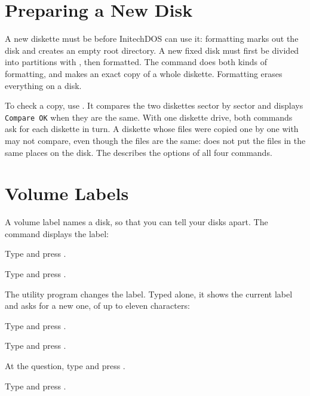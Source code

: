 \section{Preparing a New Disk}
A new diskette must be  before InitechDOS can use it:
formatting marks out the disk and creates an empty root directory.  A new
fixed disk must first be divided into partitions with , then
formatted.  The  command does both kinds of formatting, and
 makes an exact copy of a whole diskette.  Formatting erases
everything on a disk.

To check a copy, use .  It compares the two diskettes sector
by sector and displays \texttt{Compare OK} when they are the same.  With one
diskette drive, both commands ask for each diskette in turn.  A diskette
whose files were copied one by one with  may not compare, even
though the files are the same:  does not put the files in the same
places on the disk.  The  describes the
options of all four commands.

\section{Volume Labels}
A volume label names a disk, so that you can tell your disks apart.  The
 command displays the label:
\begin{Steps}
\item Type  and press .
\item Type  and press .
\end{Steps}


The  utility program changes the label.  Typed alone, it shows
the current label and asks for a new one, of up to eleven characters:
\begin{Steps}
\item Type  and press .
\item Type  and press .
\item At the question, type  and press .
\item Type  and press .
\end{Steps}

